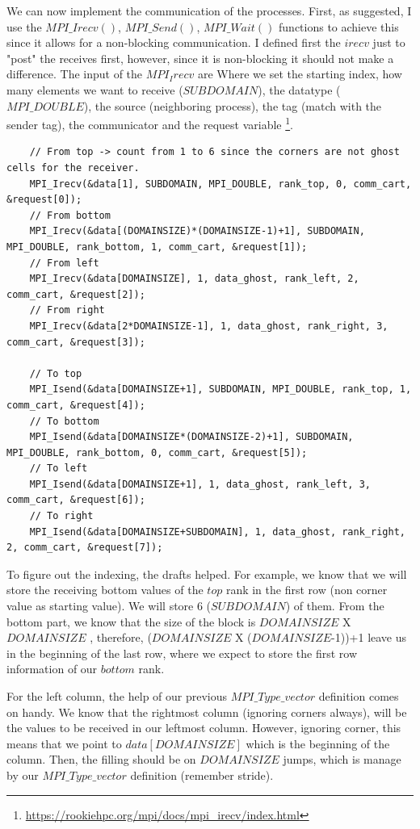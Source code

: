 \documentclass[unicode,11pt,a4paper,oneside,numbers=endperiod,openany]{scrartcl}
\begin{document}
We can now implement the communication of the processes. First, as suggested, I use the $MPI\_Irecv()$, $MPI\_Send()$, $MPI\_Wait()$ functions to achieve this since it allows for a non-blocking communication.
I defined first the $irecv$ just to "post" the receives first, however, since it is non-blocking it should not make a difference. The input of the $MPI_Irecv$ are
Where we set the starting index, how many elements we want to receive ($SUBDOMAIN$), the datatype ($MPI\_DOUBLE$), the source (neighboring process), the tag (match with the sender tag), the communicator and the request variable \footnote{\url{https://rookiehpc.org/mpi/docs/mpi_irecv/index.html}}.

\begin{lstlisting}
    // From top -> count from 1 to 6 since the corners are not ghost cells for the receiver. 
    MPI_Irecv(&data[1], SUBDOMAIN, MPI_DOUBLE, rank_top, 0, comm_cart, &request[0]);
    // From bottom
    MPI_Irecv(&data[(DOMAINSIZE)*(DOMAINSIZE-1)+1], SUBDOMAIN, MPI_DOUBLE, rank_bottom, 1, comm_cart, &request[1]);
    // From left
    MPI_Irecv(&data[DOMAINSIZE], 1, data_ghost, rank_left, 2, comm_cart, &request[2]);
    // From right
    MPI_Irecv(&data[2*DOMAINSIZE-1], 1, data_ghost, rank_right, 3, comm_cart, &request[3]);

    // To top
    MPI_Isend(&data[DOMAINSIZE+1], SUBDOMAIN, MPI_DOUBLE, rank_top, 1, comm_cart, &request[4]);
    // To bottom
    MPI_Isend(&data[DOMAINSIZE*(DOMAINSIZE-2)+1], SUBDOMAIN, MPI_DOUBLE, rank_bottom, 0, comm_cart, &request[5]);
    // To left
    MPI_Isend(&data[DOMAINSIZE+1], 1, data_ghost, rank_left, 3, comm_cart, &request[6]);
    // To right
    MPI_Isend(&data[DOMAINSIZE+SUBDOMAIN], 1, data_ghost, rank_right, 2, comm_cart, &request[7]);
\end{lstlisting}

To figure out the indexing, the drafts helped. For example, we know that we will store the receiving bottom values of the $top$ rank in the 
first row (non corner value as starting value). We will store 6 ($SUBDOMAIN$) of them. From the bottom part, we know that the size of the 
block is $DOMAINSIZE$ X $DOMAINSIZE$ , therefore, ($DOMAINSIZE$ X ($DOMAINSIZE$-1))+1 leave us in the beginning of the last row, where we expect to
store the first row information of our $bottom$ rank. 

For the left column, the help of our previous $MPI\_Type\_vector$ definition comes on handy. We know that the rightmost column (ignoring corners always), will be 
the values to be received in our leftmost column. However, ignoring corner, this means that we point to $data[DOMAINSIZE]$ which is the beginning of the column. 
Then, the filling should be on $DOMAINSIZE$ jumps, which is manage by our $MPI\_Type\_vector$ definition (remember stride). 
\end{document}

